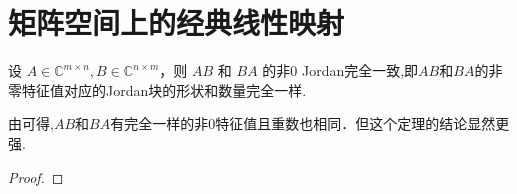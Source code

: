 \documentclass[../../main.tex]{subfiles}%
\begin{document}
\section{矩阵空间上的经典线性映射}

\begin{theorem}\label{theorem:AB和BA的非0Jordan完全一致}
设 \( A \in \mathbb{C}^{m \times n}, B \in \mathbb{C}^{n \times m} \)，则 \( AB \) 和 \( BA \) 的非0 Jordan完全一致,即$AB$和$BA$的非零特征值对应的Jordan块的形状和数量完全一样.
\end{theorem}
\begin{remark}
由可得,$AB$和$BA$有完全一样的非$0$特征值且重数也相同．但这个定理的结论显然更强.
\end{remark}
\begin{proof}


\end{proof}
\end{document}
